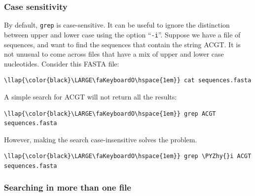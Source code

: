 \documentclass[11pt]{article}
\def\PYZhy{\char`\-}
\begin{document}
    \hypertarget{case-sensitivity}{%
\subsubsection{Case sensitivity}\label{case-sensitivity}}

By default, \texttt{grep} is case-sensitive. It can be useful to ignore
the distinction between upper and lower case using the option
``\texttt{-i}''. Suppose we have a file of sequences, and want to find
the sequences that contain the string ACGT. It is not unusual to come
across files that have a mix of upper and lower case nucleotides.
Consider this FASTA file:

\begin{terminalinput}
\begin{Verbatim}[commandchars=\\\{\}]
\llap{\color{black}\LARGE\faKeyboardO\hspace{1em}} cat sequences.fasta
\end{Verbatim}
\end{terminalinput}

    A simple search for ACGT will not return all the results:

\begin{terminalinput}
\begin{Verbatim}[commandchars=\\\{\}]
\llap{\color{black}\LARGE\faKeyboardO\hspace{1em}} grep ACGT sequences.fasta
\end{Verbatim}
\end{terminalinput}

    However, making the search case-insensitive solves the problem.

\begin{terminalinput}
\begin{Verbatim}[commandchars=\\\{\}]
\llap{\color{black}\LARGE\faKeyboardO\hspace{1em}} grep \PYZhy{}i ACGT sequences.fasta
\end{Verbatim}
\end{terminalinput}

    \hypertarget{searching-in-more-than-one-file}{%
\subsubsection{Searching in more than one
file}\label{searching-in-more-than-one-file}}
\end{document}
